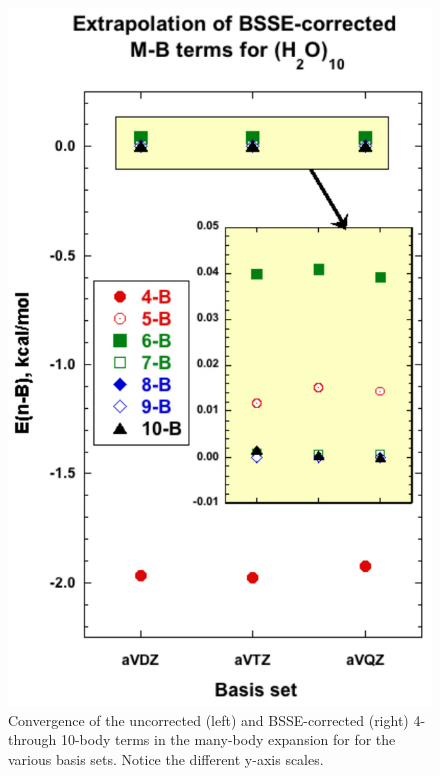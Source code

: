 \begin{figure}[h]
\begin{center}
\begin{minipage}{0.45\textwidth}
\includegraphics[width=.9\textwidth]{Figures/Chapter_2/MB_extrap_w10_BSSE_all.pdf}
\end{minipage}
\end{center}
\caption[Convergence of the uncorrected (left) and BSSE-corrected (right) 4- through 10-body terms in the many-body expansion for  for the various basis sets. Notice the different y-axis scales.]{Convergence of the uncorrected (left) and BSSE-corrected (right) 4- through 10-body terms in the many-body expansion for  for the various basis sets. Notice the different y-axis scales.}
\label{fig:MBE_I_F3}
\end{figure}